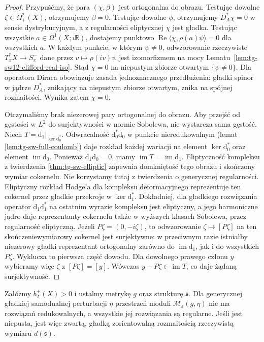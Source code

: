 \begin{proof}
Przypuśćmy, że para $(\chi,\beta)$ jest ortogonalna
do obrazu. Testując dowolne $\zeta\in\Omega^2_+(X)$,
otrzymujemy $\beta=0$. Testując dowolne $\phi$,
otrzymujemy $D_A^*\chi=0$ w sensie dystrybucyjnym,
a z regularności eliptycznej $\chi$ jest gładka.
Testując wszystkie $a\in\Omega^1(X;i\mathbb R)$,
dostajemy punktowo
$\operatorname{Re}\langle\chi,\rho(a)\psi\rangle=0$
dla wszystkich $a$. W każdym punkcie, w którym $\psi\ne0$,
odwzorowanie rzeczywiste
$T_x^*X\to S_x^-$ dane przez $v\mapsto\rho(iv)\psi$
jest izomorfizmem na mocy Lematu~\ref{lem:tg-sw12-clifford-real-iso}.
Stąd $\chi=0$ na niepustym zbiorze otwartym
$\{\psi\ne0\}$. Dla operatora Diraca obowiązuje
zasada jednoznacznego przedłużenia: gładki spinor w jądrze
$D_A^*$, znikający na niepustym zbiorze otwartym,
znika na spójnej rozmaitości. Wynika zatem $\chi=0$.

Otrzymaliśmy brak niezerowej pary ortogonalnej do obrazu.
Aby przejść od gęstości w $L^2$ do surjektywności
w normie Sobolewa, nie wystarcza sama gęstość.
Niech $T=\mathrm d_1|_{\ker\mathrm d_0^*}$.
Odwracalność $\mathrm d_0^*\mathrm d_0$ w punkcie
nieredukowalnym (lemat \ref{lem:tg-sw-full-coulomb})
daje rozkład każdej wariacji na element
$\ker\mathrm d_0^*$ oraz element
$\operatorname{im}\mathrm d_0$.
Ponieważ $\mathrm d_1\mathrm d_0=0$, mamy
$\operatorname{im}T=\operatorname{im}\mathrm d_1$.
Eliptyczność kompleksu z twierdzenia
\ref{thm:tg-sw-elliptic} zapewnia domkniętość
tego obrazu i skończony wymiar cokernelu.
Nie korzystamy tutaj z twierdzenia
o generycznej regularności.
Eliptyczny rozkład Hodge'a dla kompleksu
deformacyjnego reprezentuje ten cokernel
przez gładkie przekroje w $\ker\mathrm d_1^*$.
Dokładniej, dla gładkiego rozwiązania operator
$\mathrm d_1\mathrm d_1^*$ na ostatnim wyrazie
kompleksu jest eliptyczny, a jego harmoniczne
jądro daje reprezentanty cokernelu także
w wyższych klasach Sobolewa, przez regularność
eliptyczną. Jeżeli $P\zeta=(0,-i\zeta)$,
to odwzorowanie $\zeta\mapsto[P\zeta]$
na ten skończeniewymiarowy cokernel
jest surjektywne: w przeciwnym razie
istniałby niezerowy gładki reprezentant
ortogonalny zarówno do $\operatorname{im}\mathrm d_1$,
jak i do wszystkich $P\zeta$.
Wyklucza to pierwsza część dowodu.
Dla dowolnego prawego członu $y$ wybieramy
więc $\zeta$ z $[P\zeta]=[y]$.
Wówczas $y-P\zeta\in\operatorname{im}T$,
co daje żądaną surjektywność.
\end{proof}

\begin{twierdzenie}
\label{thm:tg-sw12-regular}
Załóżmy $b_2^+(X)>0$ i ustalmy metrykę $g$ oraz
strukturę $\mathfrak s$. Dla generycznej gładkiej
samodualnej perturbacji $\eta$ przestrzeń moduli
$\mathcal M_{\mathfrak s}(g,\eta)$ nie ma rozwiązań
redukowalnych, a wszystkie jej rozwiązania są regularne.
Jeśli jest niepusta, jest więc zwartą, gładką
zorientowalną rozmaitością rzeczywistą wymiaru
$d(\mathfrak s)$.
\end{twierdzenie}

